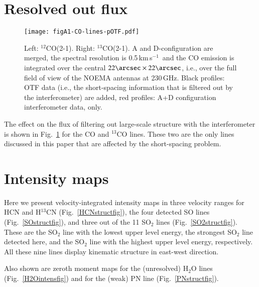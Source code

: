 \documentclass{aa}
\newcommand{\kms}{\,km\,s$^{-1}$~}
\begin{document}
\begin{appendix}

\section{Resolved out flux}
\label{resolvedfluxsec}

\begin{figure}[h]
    \centering
    \vspace{-3.0cm}
    \texttt{[image: figA1-CO-lines-pOTF.pdf]}
    \caption{Left:  $^{12}$CO(2-1).
             Right: $^{13}$CO(2-1).
             A and D-configuration are merged, the
             spectral resolution is 0.5\kms and  
             the CO emission is integrated over the central 
             $22\arcsec \times 22\arcsec$, 
             i.e., over the full field of view of the NOEMA antennas at 
             230\,GHz.
             Black profiles: OTF data (i.e., the short-spacing information that 
                             is filtered out by the interferometer) are 
                             added, red profiles: A+D configuration 
                             interferometer data, only.} 
    \label{resolvedfluxfig}
\end{figure}

The effect on the flux of filtering out large-scale structure with the
interferometer is shown in Fig.~\ref{resolvedfluxfig} for the CO and
$^{13}$CO lines. These two are the only lines discussed in this paper
that are affected by the short-spacing problem.

\section{Intensity maps}
\label{mapssec}

Here we present velocity-integrated intensity maps in three velocity
ranges for HCN and H$^{13}$CN (Fig.~\ref{HCNstructfig}), the four
detected SO lines  (Fig.~\ref{SOstructfig}), and three out of the 11
SO$_2$ lines (Fig.~\ref{SO2structfig}).  These are the SO$_2$ line
with the lowest upper level energy, the strongest SO$_2$ line detected
here, and the SO$_2$ line with the highest upper level energy,
respectively.  All these nine lines display kinematic structure in
east-west direction. 

Also shown are zeroth moment maps for the (unresolved) H$_2$O lines
(Fig.~\ref{H2Ointensfig}) and for the (weak) PN line
(Fig.~\ref{PNstructfig}).


\end{appendix}
\end{document}
